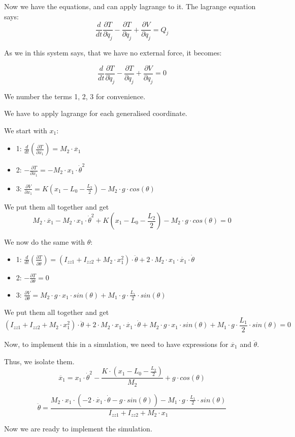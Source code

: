 \documentclass[a4paper,12pt,english]{article}
\begin{document}
Now we have the equations, and can apply lagrange to it.
The lagrange equation says:
$$\frac{d}{d t} \frac{\partial T}{\partial \dot{q}_j} - \frac{\partial T}{\partial q_j} + \frac{\partial V}{\partial q_j} = Q_j$$

As we in this system says, that we have no external force, it becomes:

$$\frac{d}{d t} \frac{\partial T}{\partial \dot{q}_j} - \frac{\partial T}{\partial q_j} + \frac{\partial V}{\partial q_j} = 0$$

We number the terms 1, 2, 3 for convenience.

We have to apply lagrange for each generalised coordinate. 

We start with $x_1$:

\begin{itemize}
\item 1: $\frac{d}{d t} \left ( \frac{\partial T}{\partial \dot{x_1}} \right ) = M_2 \cdot \ddot{x_1}$
\item 2: $- \frac{\partial T}{\partial x_1} = - M_2 \cdot x_1 \cdot \dot{\theta}^2 $
\item 3: $\frac{\partial V}{\partial x_1} = K \left(x_1 - L_0 - \frac{L_2}{2} \right) - M_2 \cdot g \cdot cos(\theta)  $
\end{itemize}
We put them all together and get
$$ M_2 \cdot \ddot{x_1} - M_2 \cdot x_1 \cdot \dot{\theta}^2 + K \left(x_1 - L_0 - \frac{L_2}{2} \right) - M_2 \cdot g \cdot cos(\theta) = 0$$

We now do the same with $\theta$:

\begin{itemize}
\item 1: $\frac{d}{d t} \left ( \frac{\partial T}{\partial \dot{\theta}} \right ) = \left( I_{zz1} + I_{zz2} + M_2 \cdot x_1^2 \right) \cdot \ddot{\theta} + 2 \cdot M_2 \cdot x_1 \cdot \dot{x_1} \cdot \dot{\theta}$
\item 2: $- \frac{\partial T}{\partial \theta} = 0  $
\item 3: $\frac{\partial V}{\partial \theta} =  M_2 \cdot g \cdot x_1 \cdot sin(\theta) + M_1 \cdot g \cdot \frac{L_1}{2} \cdot sin(\theta)$
\end{itemize}
We put them all together and get
$$ \left( I_{zz1} + I_{zz2} + M_2 \cdot x_1^2 \right) \cdot \ddot{\theta} + 2 \cdot M_2 \cdot x_1 \cdot \dot{x_1} \cdot \dot{\theta} +  M_2 \cdot g \cdot x_1 \cdot sin(\theta) + M_1 \cdot g \cdot \frac{L_1}{2} \cdot sin(\theta) = 0$$

Now, to implement this in a simulation, we need to have expressions for $\ddot{x_1}$ and $\ddot{\theta}$.

Thus, we isolate them.
$$\ddot{x_1} = x_1 \cdot \dot{\theta}^2 - \frac{K \cdot (x_1 - L_0 - \frac{L_2}{2})}{M_2} + g \cdot cos(\theta)$$


$$\ddot{\theta} = \frac{M_2 \cdot x_1 \cdot (-2 \cdot \dot{x_1} \cdot \dot{\theta} - g \cdot sin(\theta)) - M_1 \cdot g \cdot \frac{L_1}{2} \cdot sin(\theta)}{I_{zz1} + I_{zz2} + M_2 \cdot x_1}$$

Now we are ready to implement the simulation.
\end{document}
